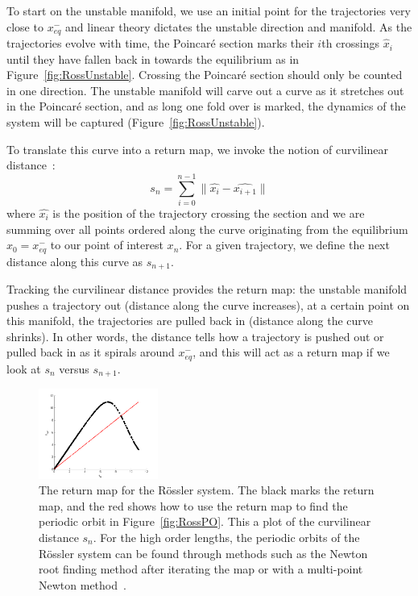 \documentclass[10pt,letter]{article}
\begin{document}
To start on the unstable manifold, we use an initial point for the
trajectories very close to $x_{eq}^{-}$ and linear theory dictates the
unstable direction and manifold.  As the trajectories evolve with time,
the Poincar\'e section marks their $i$th crossings $\hat{x}_i$ until they
have fallen back in towards the equilibrium as in
Figure~\ref{fig:RossUnstable}.  Crossing the Poincar\'e section should
only be counted in one direction.  The unstable manifold will carve out a
curve as it stretches out in the Poincar\'e section, and as long one fold
over is marked, the dynamics of the system will be captured
(Figure~\ref{fig:RossUnstable}).

To translate this curve into a return map, we invoke the notion of
curvilinear distance~\cite{SRetMap}:
\begin{equation}
 s_n = \sum_{i = 0}^{n-1} \parallel \hat{x_i} - \hat{x_{i+1}} \parallel
 \label{eq:CurveDis}
\end{equation}
where $\hat{x_i}$ is the position of the trajectory crossing the section
and we are summing over all points ordered along the curve originating
from the equilibrium $x_0 = x_{eq}^{-}$ to our point of interest $x_n$.
For a given trajectory, we define the next distance along this curve as
$s_{n+1}$.

Tracking the curvilinear distance provides the return map: the unstable
manifold pushes a trajectory out (distance along the curve increases), at
a certain point on this manifold, the trajectories are pulled back in
(distance along the curve shrinks).  In other words, the distance tells
how a trajectory is pushed out or pulled back in as it spirals around
$x_{eq}^{-}$, and this will act as a return map if we look at $s_n$
versus $s_{n+1}$.
\begin{figure}[h]
\centering
  \includegraphics[width=0.35\textwidth]{Figs/Section1/kcrosslerretmap.png}
\caption{
 The return map for the R\"ossler system.  The black marks the return
 map, and the red shows how to use the return map to find the periodic
 orbit in Figure~\ref{fig:RossPO}.  This a plot of the curvilinear
 distance $s_n$.  For the high order lengths, the periodic orbits of the
 R\"ossler system can be found through methods such as the Newton root
 finding method after iterating the map or with a multi-point Newton
 method~\cite{CB}.
}
 \label{fig:RossRetmap}
\end{figure}
\end{document}
